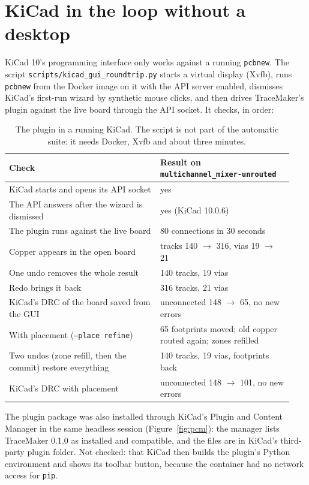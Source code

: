 \documentclass[10pt,a4paper]{article}
\newcommand{\code}[1]{\texttt{#1}}
\begin{document}
\section{KiCad in the loop without a desktop}\label{sec:gui}

KiCad 10's programming interface only works against a running \code{pcbnew}. The script
\code{scripts/kicad\_gui\_roundtrip.py} starts a virtual display (Xvfb), runs \code{pcbnew} from the Docker image
on it with the API server enabled, dismisses KiCad's first-run wizard by synthetic mouse clicks, and then drives
TraceMaker's plugin against the live board through the API socket. It checks, in order:

\begin{table}[H]
\centering\small
\begin{tabular}{@{}p{0.50\linewidth}p{0.44\linewidth}@{}}
\toprule
Check & Result on \code{multichannel\_mixer-unrouted} \\
\midrule
KiCad starts and opens its API socket & yes \\
The API answers after the wizard is dismissed & yes (KiCad 10.0.6) \\
The plugin runs against the live board & 80 connections in 30 seconds \\
Copper appears in the open board & tracks 140 $\to$ 316, vias 19 $\to$ 21 \\
One undo removes the whole result & 140 tracks, 19 vias \\
Redo brings it back & 316 tracks, 21 vias \\
KiCad's DRC of the board saved from the GUI & unconnected 148 $\to$ 65, no new errors \\
\midrule
With placement (\code{--place refine}) & 65 footprints moved; old copper routed again; zones refilled \\
Two undos (zone refill, then the commit) restore everything & 140 tracks, 19 vias, footprints back \\
KiCad's DRC with placement & unconnected 148 $\to$ 101, no new errors \\
\bottomrule
\end{tabular}
\caption{The plugin in a running KiCad. The script is not part of the automatic suite: it needs Docker, Xvfb and
about three minutes.}
\end{table}

\noindent The plugin package was also installed through KiCad's Plugin and Content Manager in the same headless
session (Figure~\ref{fig:pcm}): the manager lists TraceMaker 0.1.0 as installed and compatible, and the files
are in KiCad's third-party plugin folder. Not checked: that KiCad then builds the plugin's Python environment and
shows its toolbar button, because the container had no network access for \code{pip}.
\end{document}
